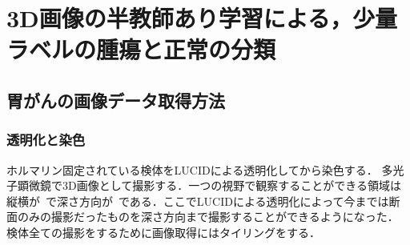 \chapter{3D画像の半教師あり学習による，少量ラベルの腫瘍と正常の分類}

\section{胃がんの画像データ取得方法}

\subsection{透明化と染色}
ホルマリン固定されている検体をLUCIDによる透明化してから染色する．
多光子顕微鏡で3D画像として撮影する．一つの視野で観察することができる領域は縦横が~で深さ方向が~である．ここでLUCIDによる透明化によって今までは断面のみの撮影だったものを深さ方向まで撮影することができるようになった．
検体全ての撮影をするために画像取得にはタイリングをする．


